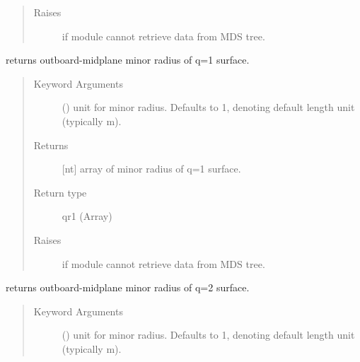 \documentclass[letterpaper,10pt,english]{sphinxmanual}
\begin{document}
\begin{fulllineitems}
\begin{fulllineitems}
\begin{quote}
\begin{description}
\item[{Raises}] \leavevmode
{} \textendash{} if module cannot retrieve data from MDS tree.

\end{description}\end{quote}

\end{fulllineitems}


\begin{fulllineitems}
\label{\detokenize{eqtools:eqtools.EFIT.EFITTree.getQ1Surf}}
returns outboard-midplane minor radius of q=1 surface.
\begin{quote}\begin{description}
\item[{Keyword Arguments}] \leavevmode
{} () \textendash{} unit for minor radius.  Defaults to 1,
denoting default length unit (typically m).

\item[{Returns}] \leavevmode
{[}nt{]} array of minor radius of q=1 surface.

\item[{Return type}] \leavevmode
qr1 (Array)

\item[{Raises}] \leavevmode
{} \textendash{} if module cannot retrieve data from MDS tree.

\end{description}\end{quote}

\end{fulllineitems}


\begin{fulllineitems}
\label{\detokenize{eqtools:eqtools.EFIT.EFITTree.getQ2Surf}}
returns outboard-midplane minor radius of q=2 surface.
\begin{quote}\begin{description}
\item[{Keyword Arguments}] \leavevmode
{} () \textendash{} unit for minor radius.  Defaults to 1,
denoting default length unit (typically m).


\end{description}
\end{quote}
\end{fulllineitems}
\end{fulllineitems}
\end{document}
